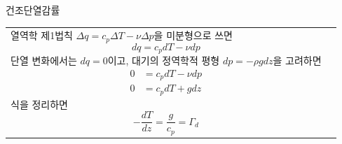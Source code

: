 \begin{frame}[t]{건조단열감률}
	\begin{tabular}{l|l}
		\begin{minipage}[t]{0.475\textwidth} \scriptsize
			열역학 제1법칙 $\Delta q = c_{p} \Delta T - \nu  \Delta p$을 미분형으로 쓰면 
				$$	{\displaystyle	{
					d q = c_{p} d T - \nu  d p
				}	}	$$
			단열 변화에서는 $d q = 0$이고, 대기의 정역학적 평형 $dp = - \rho g dz$을 고려하면
				$${\displaystyle	{
					\begin{aligned}
						0 &= c_{p} d T - \nu  d p \\
						0 &= c_{p} d T + g  d z
					\end{aligned}
				}	}	$$		
			식을 정리하면
				$${\displaystyle	{
					- \frac {dT}{dz} = \frac{g}{c_p} = {\Gamma}_{d}
				}	}$$	
		\end{minipage}	
		&
		\begin{minipage}[t]{0.475\textwidth} \scriptsize
			
			
		\end{minipage}
	\end{tabular}
\end{frame}



